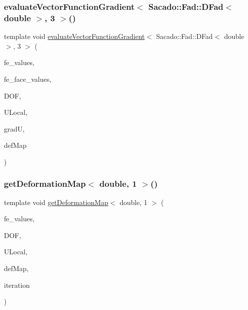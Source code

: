 \subsubsection{\texorpdfstring{evaluate\+Vector\+Function\+Gradient$<$ Sacado\+::\+Fad\+::\+D\+Fad$<$ double $>$, 3 $>$()}{evaluateVectorFunctionGradient< Sacado::Fad::DFad< double >, 3 >()}\hspace{0.1cm}{\footnotesize\ttfamily [4/4]}}
{\footnotesize\ttfamily template void \mbox{\hyperlink{group___evaluation_functions_ga9608539d601a91aff1ba01ccc720fbe0}{evaluate\+Vector\+Function\+Gradient}}$<$ Sacado\+::\+Fad\+::\+D\+Fad$<$ double $>$, 3 $>$ (\begin{DoxyParamCaption}\item[{const F\+E\+Values$<$ 3 $>$ \&}]{fe\+\_\+values,  }\item[{const F\+E\+Face\+Values$<$ 3 $>$ \&}]{fe\+\_\+face\+\_\+values,  }\item[{unsigned int}]{D\+OF,  }\item[{Table$<$ 1, Sacado\+::\+Fad\+::\+D\+Fad$<$ double $>$$>$ \&}]{U\+Local,  }\item[{Table$<$ 3, Sacado\+::\+Fad\+::\+D\+Fad$<$ double $>$$>$ \&}]{gradU,  }\item[{\mbox{\hyperlink{structdeformation_map}{deformation\+Map}}$<$ Sacado\+::\+Fad\+::\+D\+Fad$<$ double $>$, 3 $>$ \&}]{def\+Map }\end{DoxyParamCaption})}

\mbox{\label{function_evaluations_8cc_a4e726f8c8f17b338819f30946e6d4274}} 
\subsubsection{\texorpdfstring{get\+Deformation\+Map$<$ double, 1 $>$()}{getDeformationMap< double, 1 >()}\hspace{0.1cm}{\footnotesize\ttfamily [1/2]}}
{\footnotesize\ttfamily template void \mbox{\hyperlink{group___evaluation_functions_ga239b206235603af9482484c29c8d57ea}{get\+Deformation\+Map}}$<$ double, 1 $>$ (\begin{DoxyParamCaption}\item[{const F\+E\+Values$<$ 1 $>$ \&}]{fe\+\_\+values,  }\item[{unsigned int}]{D\+OF,  }\item[{Table$<$ 1, double $>$ \&}]{U\+Local,  }\item[{\mbox{\hyperlink{structdeformation_map}{deformation\+Map}}$<$ double, 1 $>$ \&}]{def\+Map,  }\item[{unsigned int}]{iteration }\end{DoxyParamCaption})}

